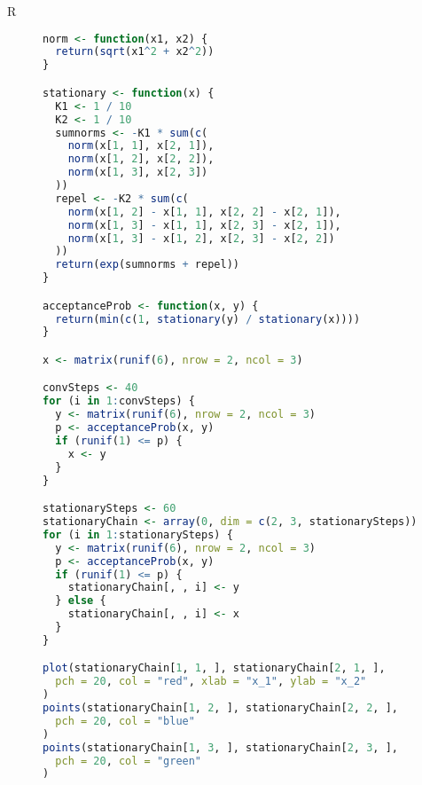 
\begin{description}



\item[R] 


\begin{lstlisting}[language=R]
norm <- function(x1, x2) {
  return(sqrt(x1^2 + x2^2))
}

stationary <- function(x) {
  K1 <- 1 / 10
  K2 <- 1 / 10
  sumnorms <- -K1 * sum(c(
    norm(x[1, 1], x[2, 1]),
    norm(x[1, 2], x[2, 2]),
    norm(x[1, 3], x[2, 3])
  ))
  repel <- -K2 * sum(c(
    norm(x[1, 2] - x[1, 1], x[2, 2] - x[2, 1]),
    norm(x[1, 3] - x[1, 1], x[2, 3] - x[2, 1]),
    norm(x[1, 3] - x[1, 2], x[2, 3] - x[2, 2])
  ))
  return(exp(sumnorms + repel))
}

acceptanceProb <- function(x, y) {
  return(min(c(1, stationary(y) / stationary(x))))
}

x <- matrix(runif(6), nrow = 2, ncol = 3)

convSteps <- 40
for (i in 1:convSteps) {
  y <- matrix(runif(6), nrow = 2, ncol = 3)
  p <- acceptanceProb(x, y)
  if (runif(1) <= p) {
    x <- y
  }
}

stationarySteps <- 60
stationaryChain <- array(0, dim = c(2, 3, stationarySteps))
for (i in 1:stationarySteps) {
  y <- matrix(runif(6), nrow = 2, ncol = 3)
  p <- acceptanceProb(x, y)
  if (runif(1) <= p) {
    stationaryChain[, , i] <- y
  } else {
    stationaryChain[, , i] <- x
  }
}

plot(stationaryChain[1, 1, ], stationaryChain[2, 1, ],
  pch = 20, col = "red", xlab = "x_1", ylab = "x_2"
)
points(stationaryChain[1, 2, ], stationaryChain[2, 2, ],
  pch = 20, col = "blue"
)
points(stationaryChain[1, 3, ], stationaryChain[2, 3, ],
  pch = 20, col = "green"
)
\end{lstlisting}  






\end{description}
